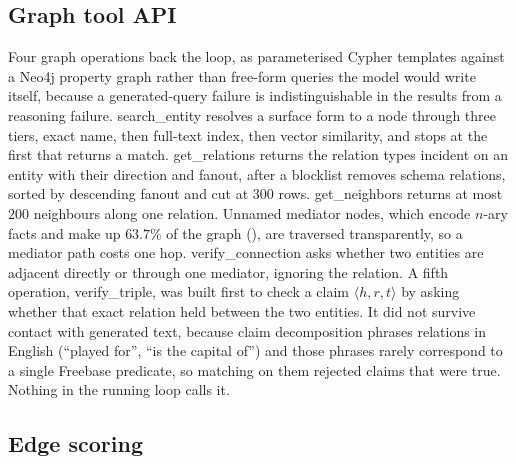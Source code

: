 \subsection{Graph tool API}\label{app:tools}

Four graph operations back the loop, as parameterised Cypher templates
against a Neo4j property graph rather than free-form queries the model
would write itself, because a generated-query failure is
indistinguishable in the results from a reasoning failure.
\textsf{search\_entity} resolves a surface form to a node through three
tiers, exact name, then full-text index, then vector similarity, and
stops at the first that returns a match. \textsf{get\_relations} returns
the relation types incident on an entity with their direction and
fanout, after a blocklist removes schema relations, sorted by descending
fanout and cut at $300$ rows. \textsf{get\_neighbors} returns at most
$200$ neighbours along one relation. Unnamed mediator nodes, which
encode $n$-ary facts and make up $63.7\%$ of the graph
(), are traversed transparently, so a mediator
path costs one hop. \textsf{verify\_connection} asks whether two
entities are adjacent directly or through one mediator, ignoring the
relation. A fifth operation, \textsf{verify\_triple}, was built first to
check a claim $\langle h, r, t \rangle$ by asking whether that exact
relation held between the two entities. It did not survive contact with
generated text, because claim decomposition phrases relations in English
(``played for'', ``is the capital of'') and those phrases rarely
correspond to a single Freebase predicate, so matching on them rejected
claims that were true. Nothing in the running loop calls it.

\subsection{Edge scoring}\label{app:scoring}

